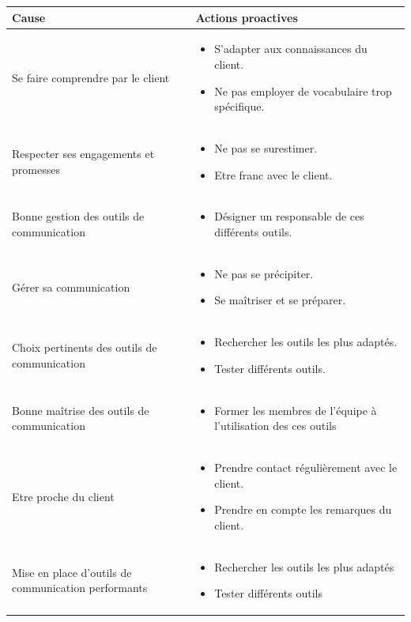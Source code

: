 {\centering
	\begin{longtable}{|p{7cm}|p{7cm}|}
	\hline
	Cause & Actions proactives \\
	\hline
	 Se faire comprendre par le client & \begin{itemize}
	 	\item S'adapter aux connaissances du client.
	 	\item Ne pas employer de vocabulaire trop spécifique.
	 \end{itemize} \\
	\hline
	Respecter ses engagements et promesses & \begin{itemize}
		\item Ne pas se surestimer.
		\item Etre franc avec le client.
	\end{itemize} \\
	\hline
	Bonne gestion des outils de communication & \begin{itemize}
		\item Désigner un responsable de ces différents outils.
	\end{itemize} \\
	\hline
	Gérer sa communication & \begin{itemize}
		\item Ne pas se précipiter.
		\item Se maîtriser et se préparer.
	\end{itemize} \\
	\hline
	Choix pertinents des outils de communication & \begin{itemize}
		\item Rechercher les outils les plus adaptés.
		\item Tester différents outils.
	\end{itemize} \\
	\hline
	Bonne maîtrise des outils de communication & \begin{itemize}
		\item Former les membres de l'équipe à l'utilisation des ces outils
	\end{itemize} \\
	\hline
	Etre proche du client & \begin{itemize}
		\item Prendre contact régulièrement avec le client.
		\item Prendre en compte les remarques du client.
	\end{itemize} \\
	\hline
	Mise en place d'outils de communication performants & \begin{itemize}
		\item Rechercher les outils les plus adaptés
		\item Tester différents outils
	\end{itemize} \\
	\hline
	\end{longtable}}

